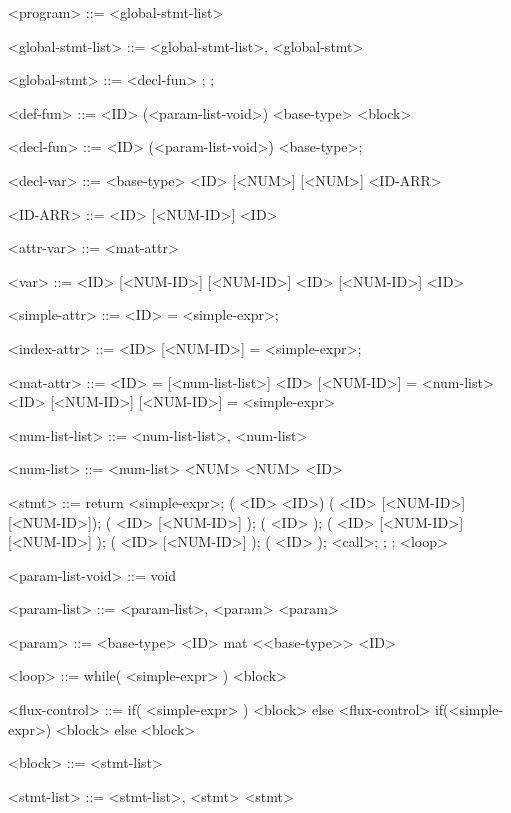 \begin{grammar}
	<program> ::= <global-stmt-list>

	<global-stmt-list> ::= <global-stmt-list>, <global-stmt> \alt <global-stmt>

	<global-stmt> ::= <decl-fun> \alt <def-fun> \alt <decl-var>; \alt <attr-var>;

	<def-fun> ::=  <ID> (<param-list-void>) <base-type> <block>

	<decl-fun> ::=   <ID> (<param-list-void>) <base-type>;

	<decl-var> ::=  <base-type> <ID> [<NUM>] [<NUM>] \alt <base-type> <ID-ARR>

	<ID-ARR> ::= <ID> [<NUM-ID>] \alt <ID>

	<attr-var> ::= <mat-attr> \alt <index-attr> \alt <simple-attr>

	<var> ::= <ID> [<NUM-ID>] [<NUM-ID>] \alt <ID> [<NUM-ID>] \alt <ID>

	<simple-attr> ::= <ID> = <simple-expr>;

	<index-attr> ::= <ID> [<NUM-ID>] = <simple-expr>;

	<mat-attr> ::= <ID> = [<num-list-list>] 
	\alt <ID> [<NUM-ID>] = {<num-list>} 
	\alt <ID> [<NUM-ID>] [<NUM-ID>] = <simple-expr>

	<num-list-list> ::=  <num-list-list>, <num-list> \alt <num-list>

	<num-list> ::= <num-list> <NUM> \alt <NUM> \alt <ID>

	<stmt> ::= return <simple-expr>;
		\alt {}( <ID> <ID>)
		\alt {}( <ID> [<NUM-ID>] [<NUM-ID>]);
		\alt {}( <ID> [<NUM-ID>] );
		\alt {}( <ID> );
		\alt {}( <ID> [<NUM-ID>] [<NUM-ID>] );
		\alt {}( <ID> [<NUM-ID>] );
		\alt {}( <ID> );
		;
		\alt <decl-var>;
		\alt <attr-var>;
		\alt <flux-control>

	<param-list-void> ::= void \alt <param-list>
	
	<param-list> ::= <param-list>, <param> \alt <param>
	
	<param> ::= <base-type> <ID> \alt mat <<base-type>> <ID>
	
	<loop> ::= while( <simple-expr> ) <block>
	
	<flux-control> ::= if( <simple-expr> ) <block> else <flux-control> \alt if(<simple-expr>) <block> else <block>
	
	<block> ::= { <stmt-list> }
	
	<stmt-list> ::= <stmt-list>, <stmt> \alt <stmt>


\end{grammar}
